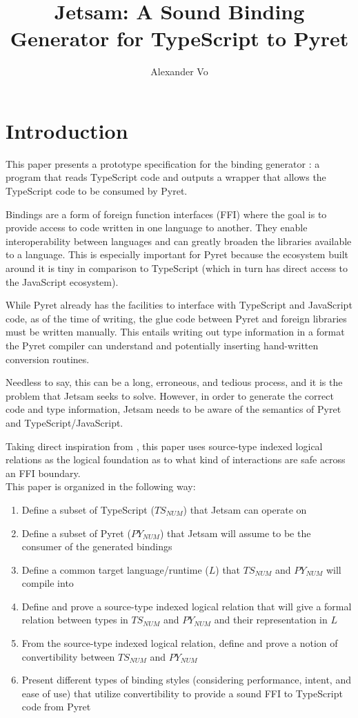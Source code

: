 \documentclass{article}
\title{Jetsam: A Sound Binding Generator for TypeScript to Pyret}
\author{Alexander Vo}
\date{}
\begin{document}
	\maketitle
	\tableofcontents
	\pagebreak
	
	\section{Introduction}
	This paper presents a prototype specification for the binding generator \textcite{JETSAM}: a program that reads TypeScript code and outputs a wrapper that allows the TypeScript code to be consumed by Pyret. 
	
	Bindings are a form of foreign function interfaces (FFI) where the goal is to provide access to code written in one language to another. They enable interoperability between languages and can greatly broaden the libraries available to a language. This is especially important for Pyret because the ecosystem built around it is tiny in comparison to TypeScript (which in turn has direct access to the JavaScript ecosystem). 
	
	While Pyret already has the facilities to interface with TypeScript and JavaScript code, as of the time of writing, the glue code between Pyret and foreign libraries must be written manually. This entails writing out type information in a format the Pyret compiler can understand and potentially inserting hand-written conversion routines.
	
	Needless to say, this can be a long, erroneous, and tedious process, and it is the problem that Jetsam seeks to solve. However, in order to generate the correct code and type information, Jetsam needs to be aware of the semantics of Pyret and TypeScript/JavaScript. 
	
	Taking direct inspiration from \textcite{FFI}, this paper uses source-type indexed logical relations as the logical foundation as to what kind of interactions are safe across an FFI boundary.\\
	
	
	This paper is organized in the following way:
	\begin{enumerate}
		\item Define a subset of TypeScript ($TS_{NUM}$) that Jetsam can operate on
		\item Define a subset of Pyret ($PY_{NUM}$) that Jetsam will assume to be the consumer of the generated bindings
		\item Define a common target language/runtime ($L$) that $TS_{NUM}$ and $PY_{NUM}$ will compile into
		\item Define and prove a source-type indexed logical relation that will give a formal relation between types in $TS_{NUM}$ and $PY_{NUM}$ and their representation in $L$
		\item From the source-type indexed logical relation, define and prove a notion of convertibility between $TS_{NUM}$ and $PY_{NUM}$
		\item Present different types of binding styles (considering performance, intent, and ease of use) that utilize convertibility to provide a sound FFI to TypeScript code from Pyret
	\end{enumerate}
\end{document}
